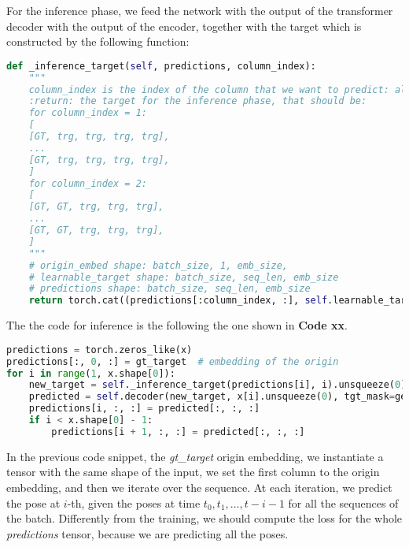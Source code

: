 For the inference phase, we feed the network with the output of the transformer decoder with the output of the encoder, together with the target which is constructed by the following function:
\begin{lstlisting}[captionpos=b, label={lst:lst-inference-target}, caption={Inference target}, language=Python]
def _inference_target(self, predictions, column_index):
    """
    column_index is the index of the column that we want to predict: always 0 < x < seq_len
    :return: the target for the inference phase, that should be:
    for column_index = 1:
    [
    [GT, trg, trg, trg, trg],
    ...
    [GT, trg, trg, trg, trg],
    ]
    for column_index = 2:
    [
    [GT, GT, trg, trg, trg],
    ...
    [GT, GT, trg, trg, trg],
    ]
    """
    # origin_embed shape: batch_size, 1, emb_size,
    # learnable_target shape: batch_size, seq_len, emb_size
    # predictions shape: batch_size, seq_len, emb_size
    return torch.cat((predictions[:column_index, :], self.learnable_target[column_index:, :]), dim=0)
\end{lstlisting}

The the code for inference is the following the one shown in \textbf{Code xx}.
\begin{lstlisting}[captionpos=b, label={lst:lst-inference}, caption={Inference}, language=Python]
predictions = torch.zeros_like(x)
predictions[:, 0, :] = gt_target  # embedding of the origin
for i in range(1, x.shape[0]):
    new_target = self._inference_target(predictions[i], i).unsqueeze(0)
    predicted = self.decoder(new_target, x[i].unsqueeze(0), tgt_mask=generate_upper_triangular_mask(x.shape).to(self.device))
    predictions[i, :, :] = predicted[:, :, :]
    if i < x.shape[0] - 1:
        predictions[i + 1, :, :] = predicted[:, :, :]
\end{lstlisting}
In the previous code snippet, the \textit{gt\_target} origin embedding, we instantiate a tensor with the same shape of the input, we set the first column to the origin embedding, and then we iterate over the sequence.
At each iteration, we predict the pose at $i$-th, given the poses at time $t_0, t_1, \dots, t-i-1$ for all the sequences of the batch.
Differently from the training, we should compute the loss for the whole \textit{predictions} tensor, because we are predicting all the poses.
